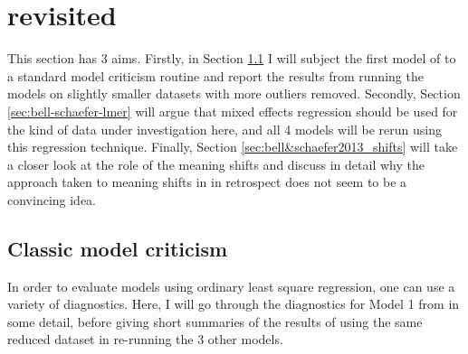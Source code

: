 
\section{\citet{BellandSchaefer:2013} revisited}
\label{sec:bell-and-schaefer-2013-revisited}

%
This section has 3 aims. Firstly, in Section \ref{sec:bell-schaefer-2013-model1-diagnostics} I will subject the first model
of \citet{BellandSchaefer:2013} to a standard model criticism routine
and report the results from running the models on slightly smaller
datasets with more outliers removed. 
Secondly, Section \ref{sec:bell-schaefer-lmer} will argue that mixed effects regression should be used
for the kind of data under investigation here, and all 4 models will
be rerun using this regression technique.
Finally, Section \ref{sec:bell&schaefer2013_shifts} will take a closer look at the role of the
meaning shifts and discuss in detail why the approach taken to meaning shifts in \citet{BellandSchaefer:2013} in retrospect does not
seem to be a convincing idea.



\subsection{Classic model criticism}
\label{sec:bell-schaefer-2013-model1-diagnostics}
In order to evaluate models using ordinary least square regression,
one can use a variety of diagnostics. Here, I will go through the
diagnostics for Model 1 from \citet{BellandSchaefer:2013} in some detail, before giving
short summaries of the results of using the same reduced dataset in
re-running the 3 other models.

